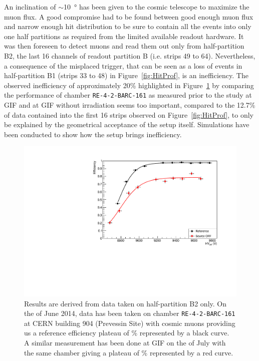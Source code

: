 	An inclination of $\sim$\SI{10}{\degree} has been given to the cosmic telescope to maximize the muon flux. A good compromise had to be found between good enough muon flux and narrow enough hit distribution to be sure to contain all the events into only one half partitions as required from the limited available readout hardware. It was then foreseen to detect muons and read them out only from half-partition B2, the last 16 channels of readout partition B (i.e. strips 49 to 64). Nevertheless, a consequence of the misplaced trigger, that can be seen as a loss of events in half-partition B1 (strips 33 to 48) in Figure~\ref{fig:HitProf}, is an inefficiency. The observed inefficiency of approximately 20\% highlighted in Figure~\ref{fig:EffCompar} by comparing the performance of chamber \texttt{RE-4-2-BARC-161} as measured prior to the study at GIF and at GIF without irradiation seems too important, compared to the 12.7\% of data contained into the first 16 strips observed on Figure~\ref{fig:HitProf}, to only be explained by the geometrical acceptance of the setup itself. Simulations have been conducted to show how the setup brings inefficiency.

	\begin{figure}[H]
            \centering
		\includegraphics[width = \plotwidth]{fig/chapt5/Compared-Efficiency.pdf}
		\caption{\label{fig:EffCompar} Results are derived from data taken on half-partition B2 only. On the  of June 2014, data has been taken on chamber \texttt{RE-4-2-BARC-161} at CERN building 904 (Prevessin Site) with cosmic muons providing us a reference efficiency plateau of \% represented by a black curve. A similar measurement has been done at GIF on the  of July with the same chamber giving a plateau of \% represented by a red curve.}
	\end{figure}
	
